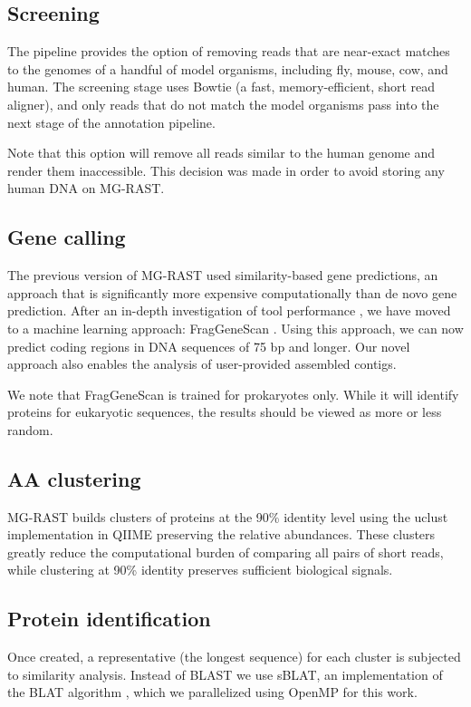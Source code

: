 \documentclass[12pt,fullpage]{report}
\begin{document}
\subsection{Screening}
The pipeline provides the option of removing reads that are near-exact matches to the genomes of a handful of model organisms, including fly, mouse, cow, and human. The screening stage uses Bowtie \cite{BOWTIE} (a fast, memory-efficient, short read aligner), and only reads that do not match the model organisms pass into the next stage of the annotation pipeline.

Note that this option will remove all reads similar to the human genome and render them inaccessible. This decision was made in order to avoid storing any human DNA on MG-RAST.
\subsection{Gene calling}

The previous version of MG-RAST used similarity-based gene predictions, an approach that is significantly more expensive computationally than de novo gene prediction. After an in-depth investigation of tool performance \cite{TRIMBLE_SHORT}, we have moved to a machine learning approach: FragGeneScan \cite{FGS}. Using this approach, we can now predict coding regions in DNA sequences of 75 bp and longer. Our novel approach also enables the analysis of user-provided assembled contigs.

We note that FragGeneScan is trained for prokaryotes only. While it will identify proteins for eukaryotic sequences, the results should be viewed as more or less random.
\subsection{AA clustering}
MG-RAST builds clusters of proteins at the 90\% identity level using the uclust \cite{UCLUST} implementation in QIIME \cite{QIIME} preserving the relative abundances. These clusters greatly reduce the computational burden of comparing all pairs of short reads, while clustering at 90\% identity preserves sufficient biological signals.
\subsection{Protein identification}
Once created, a representative (the longest sequence) for each cluster is subjected to similarity analysis. Instead of BLAST we use sBLAT, an implementation of the BLAT algorithm \cite{BLAT}, which we parallelized using OpenMP \cite{OPENMP} for this work.
\end{document}
